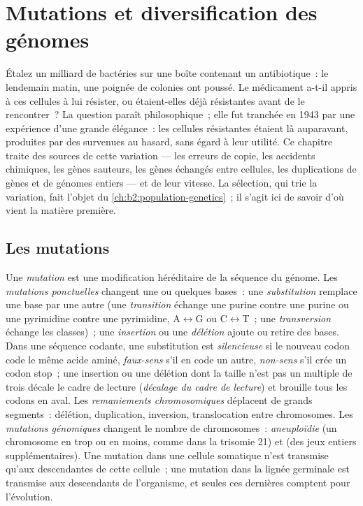 \chapter{Mutations et diversification des génomes}\label{ch:b2:genome-diversification}

Étalez un milliard de bactéries sur une boîte contenant un antibiotique~:
le lendemain matin, une poignée de colonies ont poussé. Le médicament
a-t-il appris à ces cellules à lui résister, ou étaient-elles déjà
résistantes avant de le rencontrer~? La question paraît philosophique~;
elle fut tranchée en 1943 par une expérience d'une grande élégance~: les
cellules résistantes étaient là auparavant, produites par des 
survenues au hasard, sans égard à leur utilité. Ce chapitre traite des
sources de cette variation --- les erreurs de copie, les accidents
chimiques, les gènes sauteurs, les gènes échangés entre cellules, les
duplications de gènes et de génomes entiers --- et de leur vitesse. La
sélection, qui trie la variation, fait l'objet du
\cref{ch:b2:population-genetics}~; il s'agit ici de savoir d'où vient
la matière première.

\section{Les mutations}

\begin{definition}\label{def:b2:genome-diversification:mutation}
Une \emph{mutation} est une modification héréditaire de la séquence du
génome. Les \emph{mutations ponctuelles} changent une ou quelques
bases~: une \emph{substitution} remplace une base par une autre (une
\emph{transition} échange une purine contre une purine ou une
pyrimidine contre une pyrimidine, A$\leftrightarrow$G ou C$\leftrightarrow$T~; une
\emph{transversion} échange les classes)~; une \emph{insertion} ou une
\emph{délétion} ajoute ou retire des bases. Dans une séquence codante,
une substitution est \emph{silencieuse} si le nouveau codon code le
même acide aminé, \emph{faux-sens} s'il en code un autre, \emph{non-sens}
s'il crée un codon stop~; une insertion ou une délétion dont la taille
n'est pas un multiple de trois décale le cadre de lecture
(\emph{décalage du cadre de lecture}) et brouille tous les codons en
aval. Les \emph{remaniements chromosomiques} déplacent de grands
segments~: délétion, duplication, inversion, translocation entre
chromosomes. Les \emph{mutations génomiques} changent le nombre de
chromosomes~: \emph{aneuploïdie} (un chromosome en trop ou en moins,
comme dans la trisomie 21) et \emph{} (des jeux entiers
supplémentaires). Une mutation dans une cellule somatique n'est
transmise qu'aux descendantes de cette cellule~; une mutation dans la
lignée germinale est transmise aux descendants de l'organisme, et seules
ces dernières comptent pour l'évolution.
\end{definition}

